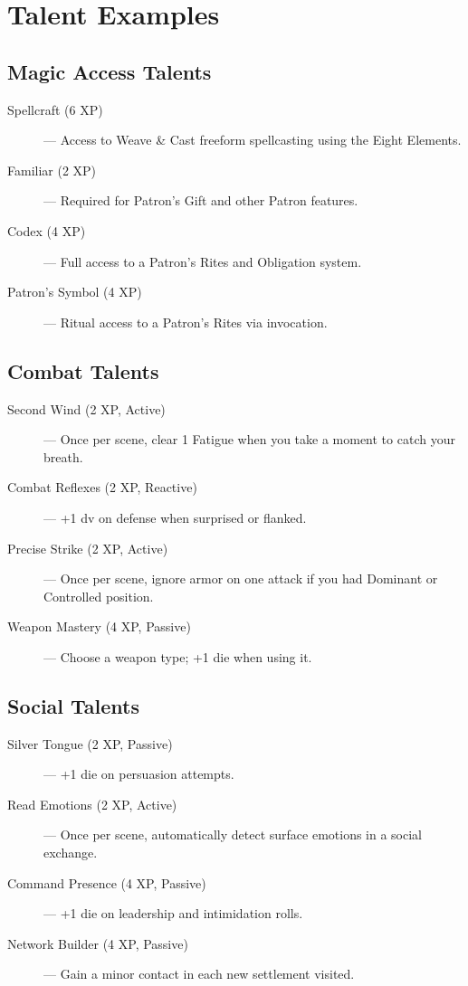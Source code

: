 \documentclass[11pt,twoside,openany]{book}
\begin{document}
\section*{Talent Examples} 

\subsection*{Magic Access Talents}

\begin{description}
\item[Spellcraft (6 XP)] --- Access to Weave \& Cast freeform spellcasting using the Eight Elements.
\item[Familiar (2 XP)] --- Required for Patron's Gift and other Patron features.
\item[Codex (4 XP)] --- Full access to a Patron's Rites and Obligation system.
\item[Patron's Symbol (4 XP)] --- Ritual access to a Patron's Rites via invocation.
\end{description}

\subsection*{Combat Talents}

\begin{description}
\item[Second Wind (2 XP, Active)] --- Once per scene, clear 1 Fatigue when you take a moment to catch your breath.
\item[Combat Reflexes (2 XP, Reactive)] --- +1 dv on defense when surprised or flanked.
\item[Precise Strike (2 XP, Active)] --- Once per scene, ignore armor on one attack if you had Dominant or Controlled position.
\item[Weapon Mastery (4 XP, Passive)] --- Choose a weapon type; +1 die when using it.
\end{description}

\subsection*{Social Talents}

\begin{description}
\item[Silver Tongue (2 XP, Passive)] --- +1 die on persuasion attempts.
\item[Read Emotions (2 XP, Active)] --- Once per scene, automatically detect surface emotions in a social exchange.
\item[Command Presence (4 XP, Passive)] --- +1 die on leadership and intimidation rolls.
\item[Network Builder (4 XP, Passive)] --- Gain a minor contact in each new settlement visited.
\end{description}
\end{document}
